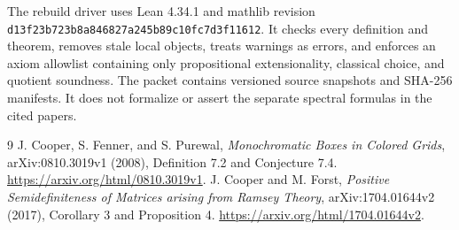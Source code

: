 \documentclass[11pt]{article}
\begin{document}
The rebuild driver uses Lean 4.34.1 and mathlib revision \texttt{d13f23b723b8a846827a245b89c10fc7d3f11612}. It checks every definition and theorem, removes stale local objects, treats warnings as errors, and enforces an axiom allowlist containing only propositional extensionality, classical choice, and quotient soundness. The packet contains versioned source snapshots and SHA-256 manifests. It does not formalize or assert the separate spectral formulas in the cited papers.
\begin{thebibliography}{9}
 J. Cooper, S. Fenner, and S. Purewal, \emph{Monochromatic Boxes in Colored Grids}, arXiv:0810.3019v1 (2008), Definition 7.2 and Conjecture 7.4. \url{https://arxiv.org/html/0810.3019v1}.
 J. Cooper and M. Forst, \emph{Positive Semidefiniteness of Matrices arising from Ramsey Theory}, arXiv:1704.01644v2 (2017), Corollary 3 and Proposition 4. \url{https://arxiv.org/html/1704.01644v2}.
\end{thebibliography}
\end{document}
